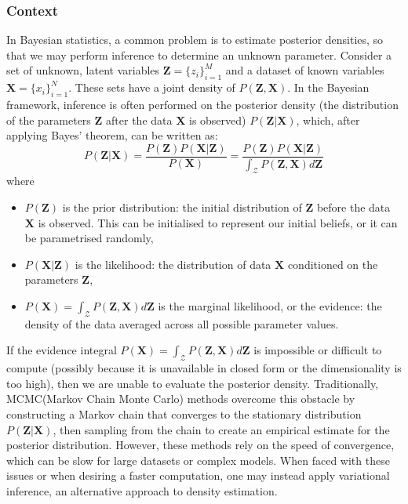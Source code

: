 \documentclass[a4paper,12pt]{article}
\numberwithin{equation}{section}
\begin{document}
\subsubsection{Context}
In Bayesian statistics, a common problem is to estimate posterior densities, so that we may perform inference to determine an unknown parameter. Consider a set of unknown, latent variables $\textbf{Z}=\{z_i\}^M_{i=1}$ and a dataset of known variables $\textbf{X}=\{x_i\}^N_{i=1}$. These sets have a joint density of $P(\textbf{Z},\textbf{X})$. In the Bayesian framework, inference is often performed on the posterior density (the distribution of the parameters $\textbf{Z}$ after the data $\textbf{X}$ is observed)
$P(\textbf{Z}|\textbf{X})$, which, after applying Bayes' theorem, can be written as:
\begin{equation*}P(\textbf{Z}|\textbf{X})=\frac{P(\textbf{Z})P(\textbf{X}|\textbf{Z})}{P(\textbf{X})}= \frac{P(\textbf{Z})P(\textbf{X}|\textbf{Z})}{\int_\mathcal{Z}P(\textbf{Z},\textbf{X})d\textbf{Z}}\end{equation*}
where
\begin{itemize}
\item $P(\textbf{Z})$ is the prior distribution: the initial distribution of $\textbf{Z}$ before the data $\textbf{X}$ is observed. This can be initialised to represent our initial beliefs, or it can be parametrised randomly,
\item $P(\textbf{X}|\textbf{Z})$ is the likelihood: the distribution of data $\textbf{X}$ conditioned on the parameters $\textbf{Z}$,
\item $P(\textbf{X})=\int_\mathcal{Z}P(\textbf{Z},\textbf{X})d\textbf{Z}$ is the marginal likelihood, or the evidence: the density of the data averaged across all possible parameter values.
\end{itemize}
If the evidence integral $P(\textbf{X})=\int_\mathcal{Z}P(\textbf{Z},\textbf{X})d\textbf{Z}$ is impossible or difficult to compute (possibly because it is unavailable in closed form or the dimensionality is too high), then we are unable to evaluate the posterior density. Traditionally, MCMC(Markov Chain Monte Carlo) methods overcome this obstacle by constructing a Markov chain that converges to the stationary distribution $P(\textbf{Z}|\textbf{X})$, then sampling from the chain to create an empirical estimate for the posterior distribution. However, these methods rely on the speed of convergence, which can be slow for large datasets or complex models. When faced with these issues or when desiring a faster computation, one may instead apply variational inference, an alternative approach to density estimation.
\end{document}
